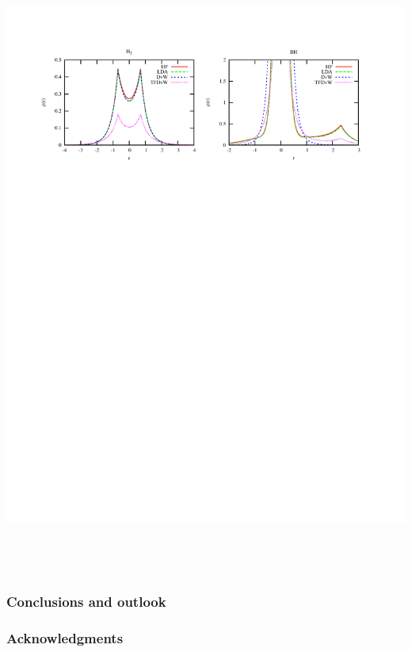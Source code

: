 \documentclass[mathserif, 8pt]{beamer}
\begin{document}
\begin{frame}
    \includegraphics[scale=0.6, viewport = 50 560 550 755]{figures/of_molecules.pdf}
    \ \\
    \ \\
    \ \\
\end{frame}

\begin{frame}
    \frametitle{Conclusions and outlook}
\end{frame}

\begin{frame}
    \frametitle{Acknowledgments}
\end{frame}
\end{document}

